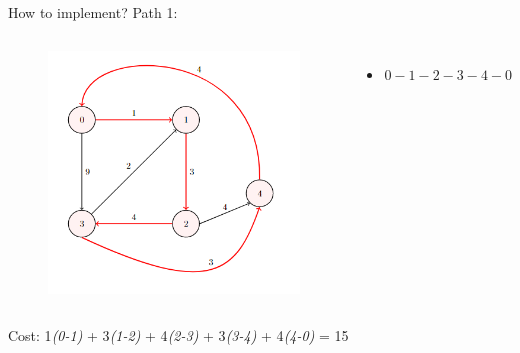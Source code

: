 \documentclass{beamer}
\begin{document}
\begin{frame}{How to implement?}
    Path 1:
    \begin{columns}
    \begin{figure}[h]
        \centering
        \includegraphics[scale=0.6]{g2.png}
    \end{figure}
    \begin{itemize}
        \item<1-> $0-1-2-3-4-0$
    \end{itemize}
    \end{columns}
    \begin{center}Cost: 1\emph{(0-1)} + 3\emph{(1-2)} + 4\emph{(2-3)} + 3\emph{(3-4)} + 4\emph{(4-0)} = 15\end{center}
\end{frame}
\end{document}
